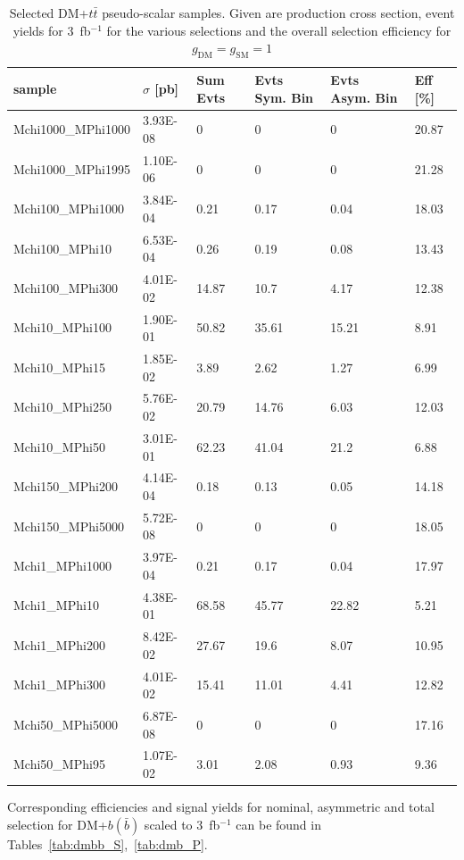 \begin{table}[h!]
\small
\centering
\begin{tabular}{l|lllll}
\hline
sample             & $\sigma$ [pb] & Sum Evts       & Evts Sym. Bin & Evts Asym. Bin & Eff  [\%]   \\\hline
Mchi1000\_MPhi1000 & 3.93E-08 & 0     & 0     & 0     & 20.87 \\
Mchi1000\_MPhi1995 & 1.10E-06 & 0     & 0     & 0     & 21.28 \\
Mchi100\_MPhi1000  & 3.84E-04 & 0.21  & 0.17  & 0.04  & 18.03 \\
Mchi100\_MPhi10    & 6.53E-04 & 0.26  & 0.19  & 0.08  & 13.43 \\
Mchi100\_MPhi300   & 4.01E-02 & 14.87 & 10.7  & 4.17  & 12.38 \\
Mchi10\_MPhi100    & 1.90E-01 & 50.82 & 35.61 & 15.21 & 8.91  \\
Mchi10\_MPhi15     & 1.85E-02 & 3.89  & 2.62  & 1.27  & 6.99  \\
Mchi10\_MPhi250    & 5.76E-02 & 20.79 & 14.76 & 6.03  & 12.03 \\
Mchi10\_MPhi50     & 3.01E-01 & 62.23 & 41.04 & 21.2  & 6.88  \\
Mchi150\_MPhi200   & 4.14E-04 & 0.18  & 0.13  & 0.05  & 14.18 \\
Mchi150\_MPhi5000  & 5.72E-08 & 0     & 0     & 0     & 18.05 \\
Mchi1\_MPhi1000    & 3.97E-04 & 0.21  & 0.17  & 0.04  & 17.97 \\
Mchi1\_MPhi10      & 4.38E-01 & 68.58 & 45.77 & 22.82 & 5.21  \\
Mchi1\_MPhi200     & 8.42E-02 & 27.67 & 19.6  & 8.07  & 10.95 \\
Mchi1\_MPhi300     & 4.01E-02 & 15.41 & 11.01 & 4.41  & 12.82 \\
Mchi50\_MPhi5000   & 6.87E-08 & 0     & 0     & 0     & 17.16 \\
Mchi50\_MPhi95     & 1.07E-02 & 3.01  & 2.08  & 0.93  & 9.36 \\
\hline
\end{tabular}
\caption{Selected DM+$t\bar{t}$ pseudo-scalar samples. Given are production cross section, event yields for 3~fb$^{-1 }$ for the various selections and the overall selection efficiency for $g_\textrm{DM}=g_\textrm{SM}=1$ \label{tab:dmtt_P}}
\end{table}


Corresponding efficiencies and signal yields for nominal, asymmetric and total selection for DM+$b(\bar{b})$ scaled to 3~fb$^{-1}$ can be found in Tables~\ref{tab:dmbb_S},~\ref{tab:dmb_P}.

